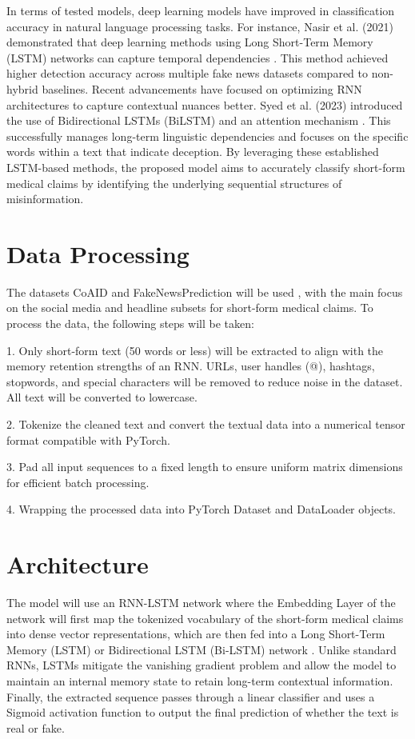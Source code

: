 \documentclass[final]{article}
\begin{document}
In terms of tested models, deep learning models have improved in classification accuracy in natural language processing tasks. For instance, Nasir et al. (2021) demonstrated that deep learning methods using Long Short-Term Memory (LSTM) networks can capture temporal dependencies \cite{lokhande2023fake}. This method achieved higher detection accuracy across multiple fake news datasets compared to non-hybrid baselines. Recent advancements have focused on optimizing RNN architectures to capture contextual nuances better. Syed et al. (2023) introduced the use of Bidirectional LSTMs (BiLSTM) and an attention mechanism \cite{padalko2024novel}. This successfully manages long-term linguistic dependencies and focuses on the specific words within a text that indicate deception. By leveraging these established LSTM-based methods, the proposed model aims to accurately classify short-form medical claims by identifying the underlying sequential structures of misinformation.
\section*{Data Processing}
The datasets CoAID and FakeNewsPrediction will be used \cite{arashnic_covid19_fakenews}\cite{kumar_fake_news}, with the main focus on the social media and headline subsets for short-form medical claims. To process the data, the following steps will be taken: 

1. Only short-form text (50 words or less) will be extracted to align with the memory retention strengths of an RNN. 
URLs, user handles (@), hashtags, stopwords, and special characters will be removed to reduce noise in the dataset. All text will be converted to lowercase. 

2. Tokenize the cleaned text and convert the textual data into a numerical tensor format compatible with PyTorch.

3. Pad all input sequences to a fixed length to ensure uniform matrix dimensions for efficient batch processing.

4. Wrapping the processed data into PyTorch Dataset and DataLoader objects.
\section*{Architecture}
The model will use an RNN-LSTM network where the Embedding Layer of the network will first map the tokenized vocabulary of the short-form medical claims into dense vector representations, which are then fed into a Long Short-Term Memory (LSTM) or Bidirectional LSTM (Bi-LSTM) network \cite{10370534}. Unlike standard RNNs, LSTMs mitigate the vanishing gradient problem and allow the model to maintain an internal memory state to retain long-term contextual information. Finally, the extracted sequence passes through a linear classifier and uses a Sigmoid activation function to output the final prediction of whether the text is real or fake.
\end{document}
